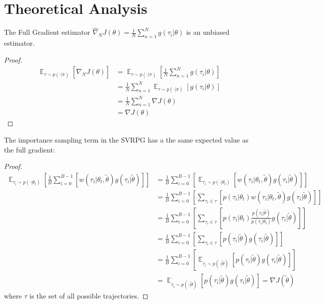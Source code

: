 \section{Theoretical Analysis}
\label{section:analysis}

The Full Gradient estimator $\widehat{\nabla}_N J\left(\theta \right)=\frac{1}{N}\sum_{n=1}^N g(\tau_i|\theta)$ is an unbiased estimator.

\begin{proof}
\begin{align*}
    \mathop{{}\mathbb{E}}_{\tau \sim p(\cdot|\pi)}\left[\widehat{\nabla}_N J\left(\theta \right)\right] &= \mathop{{}\mathbb{E}}_{\tau \sim p(\cdot|\pi)}\left[\frac{1}{N}\sum_{n=1}^N g(\tau_i|\theta)\right]\\
    &=\frac{1}{N}\sum_{n=1}^N \mathop{{}\mathbb{E}}_{\tau \sim p(\cdot|\pi)}\left[g(\tau_i|\theta)\right]\\
    &=\frac{1}{N}\sum_{n=1}^N \nabla J\left(\theta \right)\\
    &=\nabla J\left(\theta \right)
\end{align*}
\end{proof}

The importance sampling term in the SVRPG has a the same expected value as the full gradient:

\begin{proof}
\begin{align*}
    \mathop{{}\mathbb{E}}_{\tau_i \sim p(\cdot|\theta_t)}\left[\frac{1}{B}\sum_{i=0}^{B-1}\left[w(\tau_i|\theta_t, \tilde{\theta})g(\tau_i|\tilde{\theta}) \right]\right] &= \frac{1}{B}\sum_{i=0}^{B-1}\left[\mathop{{}\mathbb{E}}_{\tau_i \sim p(\cdot|\theta_t)}\left[w(\tau_i|\theta_t, \tilde{\theta})g(\tau_i|\tilde{\theta}) \right]\right]\\
    &= \frac{1}{B}\sum_{i=0}^{B-1}\left[\sum_{\tau_i \in \tau}\left[p(\tau_i|\theta_t)w(\tau_i|\theta_t, \tilde{\theta})g(\tau_i|\tilde{\theta}) \right]\right]\\
    &= \frac{1}{B}\sum_{i=0}^{B-1}\left[\sum_{\tau_i \in \tau}\left[p(\tau_i|\theta_t)\frac{p(\tau_i|\tilde{\theta})}{p(\tau_i|\theta_t)}g(\tau_i|\tilde{\theta}) \right]\right]\\
    &= \frac{1}{B}\sum_{i=0}^{B-1}\left[\sum_{\tau_i \in \tau}\left[p(\tau_i|\tilde{\theta})g(\tau_i|\tilde{\theta}) \right]\right]\\
    &= \frac{1}{B}\sum_{i=0}^{B-1}\left[\mathop{{}\mathbb{E}}_{\tau_i \sim p(\cdot|\tilde{\theta})}\left[p(\tau_i|\tilde{\theta})g(\tau_i|\tilde{\theta}) \right]\right]\\
    &= \mathop{{}\mathbb{E}}_{\tau_i \sim p(\cdot|\tilde{\theta})}\left[p(\tau_i|\tilde{\theta})g(\tau_i|\tilde{\theta}) \right] = \nabla J(\tilde{\theta})
\end{align*}
where $\tau$ is the set of all possible trajectories.
\end{proof}

